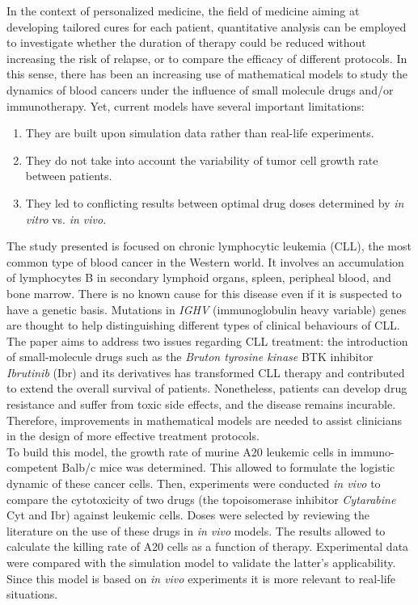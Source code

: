 In the context of personalized medicine, the field of medicine aiming at developing tailored cures for each patient, quantitative analysis can be employed to investigate whether the duration of therapy could be reduced without increasing the risk of relapse, or to compare the efficacy of different protocols\cite{pers-med}.
In this sense, there has been an increasing use of mathematical models to study the dynamics of blood cancers under the influence of small molecule drugs and/or immunotherapy.
Yet, current models have several important limitations: 
\begin{enumerate}
	\item They are built upon simulation data rather than real-life experiments.
	\item They do not take into account the variability of tumor cell growth rate between patients.
	\item They led to conflicting results between optimal drug doses determined by \textit{in vitro} vs. \textit{in vivo}.
\end{enumerate}

The study presented\cite{main-paper} is focused on chronic lymphocytic leukemia (CLL), the most common type of blood cancer in the Western world.
It involves an accumulation of lymphocytes B in secondary lymphoid organs, spleen, peripheal blood, and bone marrow.\cite{cll-burger-med, cll-rozman-med}  There is no known cause for this disease even if it is suspected to have a genetic basis. Mutations in \textit{IGHV} (immunoglobulin heavy variable) genes are thought to help distinguishing different types of clinical behaviours of CLL\cite{immunogl-med}.\\
The paper aims to address two issues regarding CLL treatment: the introduction of small-molecule drugs such as the \textit{Bruton tyrosine kinase} BTK inhibitor \textit{Ibrutinib} (Ibr) and its derivatives has transformed CLL therapy and contributed to extend the overall survival of patients.
Nonetheless, patients can develop drug resistance and suffer from toxic side effects, and the disease remains incurable. Therefore, improvements in mathematical models are needed to assist clinicians in the design of more effective treatment protocols.\\
To build this model, the growth rate of murine A20 leukemic cells in immuno-competent Balb/c mice was determined. This allowed to formulate the logistic dynamic of these cancer cells. 
Then, experiments were conducted \textit{in vivo} to compare the cytotoxicity of two drugs (the topoisomerase inhibitor \textit{Cytarabine} Cyt and Ibr) against leukemic cells. Doses were selected by reviewing the literature on the use of these drugs in \textit{in vivo} models. The results allowed to calculate the killing rate of A20 cells as a function of therapy. 
Experimental data were compared with the simulation model to validate the latter’s applicability. Since this model is based on \textit{in vivo} experiments it is more relevant to real-life situations.

